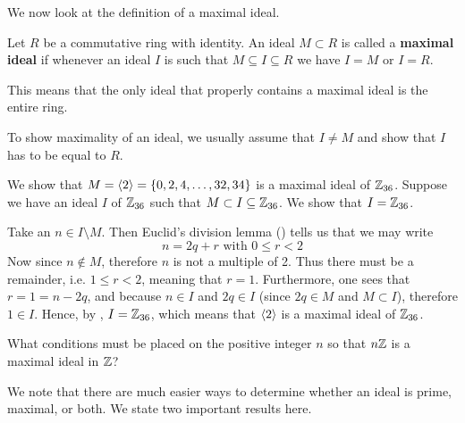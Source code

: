 We now look at the definition of a maximal ideal.
\begin{definition}
    Let $R$ be a commutative ring with identity. An ideal $M \subset R$ is called a \textbf{maximal ideal} if whenever an ideal $I$ is such that $M \subseteq I \subseteq R$ we have $I = M$ or $I = R$.
\end{definition}
\begin{remark}
    This means that the only ideal that properly contains a maximal ideal is the entire ring.
\end{remark}
\begin{remark}
    To show maximality of an ideal, we usually assume that $I \neq M$ and show that $I$ has to be equal to $R$.
\end{remark}
\begin{example}
    We show that $M = \left\langle2\right\rangle = \{0, 2, 4, \dots, 32, 34\}$ is a maximal ideal of $\mathbb{Z}_{36}$. Suppose we have an ideal $I$ of $\mathbb{Z}_{36}$ such that $M \subset I \subseteq \mathbb{Z}_{36}$. We show that $I = \mathbb{Z}_{36}$.

    Take an $n \in I \setminus M$. Then Euclid's division lemma () tells us that we may write
    \[
        n = 2q + r \text{ with } 0 \leq r < 2
    \]
    Now since $n \notin M$, therefore $n$ is not a multiple of 2. Thus there must be a remainder, i.e. $1 \leq r < 2$, meaning that $r = 1$. Furthermore, one sees that $r = 1 = n - 2q$, and because $n \in I$ and $2q \in I$ (since $2q \in M$ and $M \subset I$), therefore $1 \in I$. Hence, by , $I = \mathbb{Z}_{36}$, which means that $\left\langle2\right\rangle$ is a maximal ideal of $\mathbb{Z}_{36}$.
\end{example}
\begin{exercise}
    What conditions must be placed on the positive integer $n$ so that $n\mathbb{Z}$ is a maximal ideal in $\mathbb{Z}$?
\end{exercise}

We note that there are much easier ways to determine whether an ideal is prime, maximal, or both. We state two important results here.

